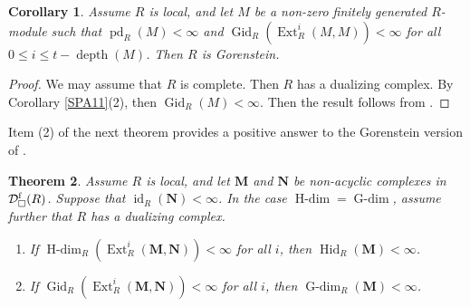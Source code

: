 \documentclass[11pt, a4paper,pagebackref]{amsart}
\numberwithin{equation}{section}
\newtheorem{theorem}{Theorem}[section]
\newtheorem{corollary}[theorem]{Corollary}
\theoremstyle{definition}
\newtheorem{remark and definition}[theorem]{Remark and Definition}
\newtheorem{remark and notation}[theorem]{Remark and Notation}
\newcommand\Ext{\operatorname{Ext}}
\begin{document}
 \begin{corollary}\label{Gor1}
     Assume $R$ is local, and let $M$ be a non-zero finitely generated $R$-module such that $\operatorname{pd}_R(M)<\infty$ and $\operatorname{Gid}_R(\Ext_R^i(M,M))<\infty$ for all $0\leq i\leq t-\operatorname{depth}(M)$.  Then $R$ is Gorenstein. 
 \end{corollary}  
 \begin{proof}
     We may assume that $R$ is complete. Then $R$ has a dualizing complex. By Corollary \ref{SPA11}(2), then $\operatorname{Gid}_R(M)<\infty$. Then the result follows from  \cite[Theorem 6.3.2]{GorensteinDimensions}.
 \end{proof}

Item (2) of the next theorem provides a positive answer to the Gorenstein version of  \cite[Question 4.5]{GorensteinringsviahomologicaldimensionsandsymmetryinvanishingofExtandTatecohomology}. 

\begin{theorem}\label{q221}
   Assume $R$ is local, and let $\boldsymbol{M}$ and $\boldsymbol{N}$ be non-acyclic complexes in $\mathcal{D}_{\square}^{\rm f}(R)$. 
    Suppose that $\operatorname{id}_R(\boldsymbol{N})<\infty$. In the case $\operatorname{H-dim}=\operatorname{G-dim}$, assume further that $R$ has a dualizing complex.
    \begin{enumerate}[\rm(1)]
        \item If $\operatorname{H-dim}_R(\Ext_R^i(\boldsymbol{M},\boldsymbol{N}))<\infty$ for all $i$, then $\operatorname{Hid}_R(\boldsymbol{M})<\infty$.  
        \item If $\operatorname{Gid}_R(\Ext_R^i(\boldsymbol{M}, \boldsymbol{N}))<\infty$ for all $i$, then  $\operatorname{G-dim}_R(\boldsymbol{M})<\infty$.
    \end{enumerate}
\end{theorem}
\end{document}
